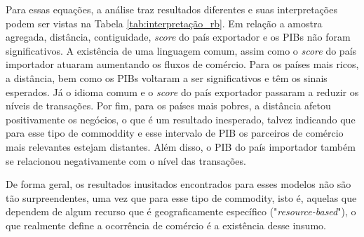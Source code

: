 Para essas equações, a análise traz resultados diferentes e suas interpretações podem ser vistas na Tabela \ref{tab:interpretação_rb}. Em relação a amostra agregada, distância, contiguidade, \textit{score} do país exportador e os PIBs não foram significativos. A existência de uma linguagem comum, assim como o \textit{score} do país importador atuaram aumentando os fluxos de comércio. Para os países mais ricos, a distância, bem como os PIBs voltaram a ser significativos e têm os sinais esperados. Já o idioma comum e o \textit{score} do país exportador passaram a reduzir os níveis de transações. Por fim, para os países mais pobres, a distância afetou positivamente os negócios, o que é um resultado inesperado, talvez indicando que para esse tipo de commoddity e esse intervalo de PIB os parceiros de comércio mais relevantes estejam distantes. Além disso, o PIB do país importador também se relacionou negativamente com o nível das transações.

De forma geral, os resultados inusitados encontrados para esses modelos não são tão surpreendentes, uma vez que para esse tipo de commodity, isto é, aquelas que dependem de algum recurso que é geograficamente específico ("\textit{resource-based}"), o que realmente define a ocorrência de comércio é a existência desse insumo.

